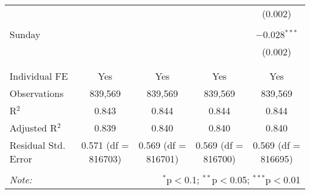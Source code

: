 \documentclass[
]{article}
\begin{document}
\begin{table}[!htbp]
{\begin{tabular}{@{\extracolsep{5pt}}lcccc}
  &  &  &  & (0.002) \\ 
  & & & & \\ 
 Sunday &  &  &  & $-$0.028$^{***}$ \\ 
  &  &  &  & (0.002) \\ 
  & & & & \\ 
\hline \\[-1.8ex] 
Individual FE & Yes & Yes & Yes & Yes \\ 
Observations & 839,569 & 839,569 & 839,569 & 839,569 \\ 
R$^{2}$ & 0.843 & 0.844 & 0.844 & 0.844 \\ 
Adjusted R$^{2}$ & 0.839 & 0.840 & 0.840 & 0.840 \\ 
Residual Std. Error & 0.571 (df = 816703) & 0.569 (df = 816701) & 0.569 (df = 816700) & 0.569 (df = 816695) \\ 
\hline 
\hline \\[-1.8ex] 
\textit{Note:}  & \multicolumn{4}{r}{$^{*}$p$<$0.1; $^{**}$p$<$0.05; $^{***}$p$<$0.01} \\ 
\end{tabular}
} 
\end{table} 
\newpage
\end{document}
